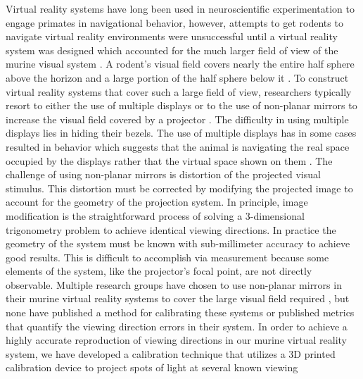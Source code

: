 \documentclass{article}
\begin{document}
Virtual reality systems have long been used in neuroscientific experimentation
to engage primates in navigational behavior, however, attempts to get rodents
to navigate virtual reality environments were unsuccessful until a virtual
reality system was designed which accounted for the much larger field of view
of the murine visual system \cite{holscher2005rats, keller2012sensorimotor,
schmidt2013cellular, ayaz2013locomotion, saleem2013integration,
aronov2014engagement, rickgauer2014simultaneous, aghajan2015impaired}.  A
rodent’s visual field covers nearly the entire half sphere above the horizon
and a large portion of the half sphere below it \cite{hughes1977topography,
wagor1980retinotopic, schuett2002mapping, wang2007area}.  To construct virtual
reality systems that cover such a large field of view, researchers typically
resort to either the use of multiple displays \cite{keller2012sensorimotor,
ayaz2013locomotion, saleem2013integration} or to the use of non-planar mirrors
to increase the visual field covered by a projector
\cite{harvey2009intracellular, schmidt2013cellular, aronov2014engagement}.  The
difficulty in using multiple displays lies in hiding their bezels. The use of
multiple displays has in some cases resulted in behavior which suggests that
the animal is navigating the real space occupied by the displays rather that
the virtual space shown on them \cite{holscher2005rats}.  The challenge of
using non-planar mirrors is distortion of the projected visual stimulus. This
distortion must be corrected by modifying the projected image to account for
the geometry of the projection system.  In principle, image modification is the
straightforward process of solving a 3-dimensional trigonometry problem to
achieve identical viewing directions. In practice the geometry of the system
must be known with sub-millimeter accuracy to achieve good results.  This is
difficult to accomplish via measurement because some elements of the system,
like the projector's focal point, are not directly observable.  Multiple
research groups have chosen to use non-planar mirrors in their murine virtual
reality systems to cover the large visual field required
\cite{holscher2005rats, harvey2009intracellular}, but none have published a
method for calibrating these systems or published metrics that
quantify the viewing direction errors in their system. In order to achieve a
highly accurate reproduction of viewing directions in our murine virtual
reality system, we have developed a calibration technique that utilizes a 3D
printed calibration device to project spots of light at several known viewing
\end{document}
